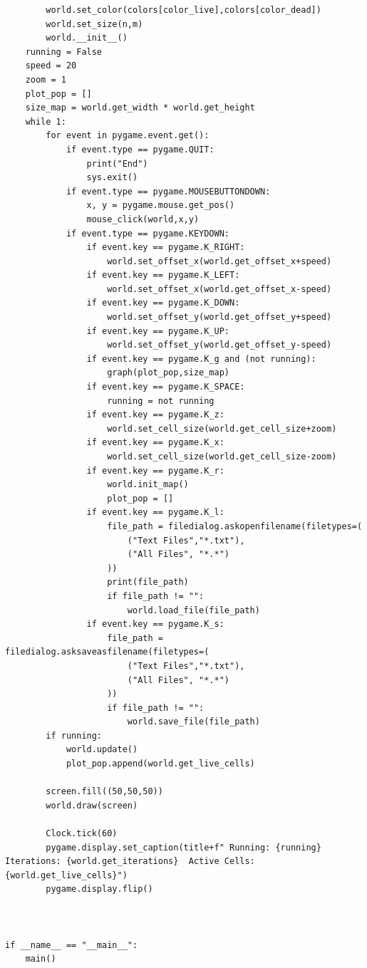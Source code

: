 \documentclass[10pt]{article}
\begin{document}
\begin{lstlisting}
        world.set_color(colors[color_live],colors[color_dead])
        world.set_size(n,m)
        world.__init__()
    running = False
    speed = 20
    zoom = 1
    plot_pop = []
    size_map = world.get_width * world.get_height
    while 1:
        for event in pygame.event.get():
            if event.type == pygame.QUIT:
                print("End")
                sys.exit()
            if event.type == pygame.MOUSEBUTTONDOWN:
                x, y = pygame.mouse.get_pos()
                mouse_click(world,x,y)
            if event.type == pygame.KEYDOWN:
                if event.key == pygame.K_RIGHT:
                    world.set_offset_x(world.get_offset_x+speed)
                if event.key == pygame.K_LEFT:
                    world.set_offset_x(world.get_offset_x-speed)
                if event.key == pygame.K_DOWN:
                    world.set_offset_y(world.get_offset_y+speed)
                if event.key == pygame.K_UP:
                    world.set_offset_y(world.get_offset_y-speed)
                if event.key == pygame.K_g and (not running):
                    graph(plot_pop,size_map)
                if event.key == pygame.K_SPACE:
                    running = not running
                if event.key == pygame.K_z:
                    world.set_cell_size(world.get_cell_size+zoom)
                if event.key == pygame.K_x:
                    world.set_cell_size(world.get_cell_size-zoom)
                if event.key == pygame.K_r:
                    world.init_map()
                    plot_pop = []
                if event.key == pygame.K_l:
                    file_path = filedialog.askopenfilename(filetypes=(
                        ("Text Files","*.txt"),
                        ("All Files", "*.*")
                    ))
                    print(file_path)
                    if file_path != "":
                        world.load_file(file_path)
                if event.key == pygame.K_s:
                    file_path = filedialog.asksaveasfilename(filetypes=(
                        ("Text Files","*.txt"),
                        ("All Files", "*.*")
                    ))
                    if file_path != "":
                        world.save_file(file_path)
        if running:
            world.update()
            plot_pop.append(world.get_live_cells)
            
        screen.fill((50,50,50))
        world.draw(screen)

        Clock.tick(60)
        pygame.display.set_caption(title+f" Running: {running} Iterations: {world.get_iterations}  Active Cells: {world.get_live_cells}")
        pygame.display.flip()



if __name__ == "__main__":
    main()
                \end{lstlisting}
		
\end{document}
